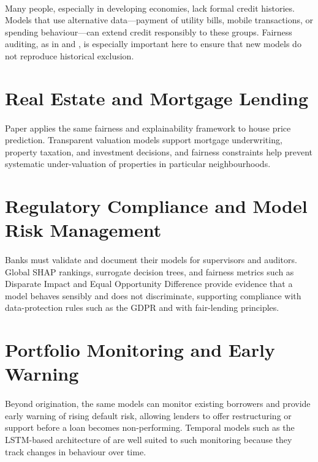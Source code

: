 \documentclass[12pt,a4paper,final]{extreport}
\begin{document}
\paragraph{} Many people, especially in developing economies, lack formal credit histories. Models that use alternative data---payment of utility bills, mobile transactions, or spending behaviour---can extend credit responsibly to these groups. Fairness auditing, as in \cite{p1} and \cite{p4}, is especially important here to ensure that new models do not reproduce historical exclusion.

\section{Real Estate and Mortgage Lending}

\paragraph{} Paper \cite{p4} applies the same fairness and explainability framework to house price prediction. Transparent valuation models support mortgage underwriting, property taxation, and investment decisions, and fairness constraints help prevent systematic under-valuation of properties in particular neighbourhoods.

\section{Regulatory Compliance and Model Risk Management}

\paragraph{} Banks must validate and document their models for supervisors and auditors. Global SHAP rankings, surrogate decision trees, and fairness metrics such as Disparate Impact and Equal Opportunity Difference provide evidence that a model behaves sensibly and does not discriminate, supporting compliance with data-protection rules such as the GDPR and with fair-lending principles.

\section{Portfolio Monitoring and Early Warning}

\paragraph{} Beyond origination, the same models can monitor existing borrowers and provide early warning of rising default risk, allowing lenders to offer restructuring or support before a loan becomes non-performing. Temporal models such as the LSTM-based architecture of \cite{p1} are well suited to such monitoring because they track changes in behaviour over time.
\end{document}
